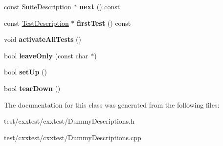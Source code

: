 \begin{DoxyCompactItemize}
\item 
\hypertarget{classCxxTest_1_1DummySuiteDescription_a375e255366523dae2bf42b30644ab924}{const \hyperlink{classCxxTest_1_1SuiteDescription}{Suite\-Description} $\ast$ {\bfseries next} () const }\label{classCxxTest_1_1DummySuiteDescription_a375e255366523dae2bf42b30644ab924}

\item 
\hypertarget{classCxxTest_1_1DummySuiteDescription_a3f14f70a29bde28dfede9627f684baa5}{const \hyperlink{classCxxTest_1_1TestDescription}{Test\-Description} $\ast$ {\bfseries first\-Test} () const }\label{classCxxTest_1_1DummySuiteDescription_a3f14f70a29bde28dfede9627f684baa5}

\item 
\hypertarget{classCxxTest_1_1DummySuiteDescription_ad0b362a31490c87bcc78d4f00b4026b4}{void {\bfseries activate\-All\-Tests} ()}\label{classCxxTest_1_1DummySuiteDescription_ad0b362a31490c87bcc78d4f00b4026b4}

\item 
\hypertarget{classCxxTest_1_1DummySuiteDescription_a7cf85000912335e4a70aed43190c2845}{bool {\bfseries leave\-Only} (const char $\ast$)}\label{classCxxTest_1_1DummySuiteDescription_a7cf85000912335e4a70aed43190c2845}

\item 
\hypertarget{classCxxTest_1_1DummySuiteDescription_a7c6d90effe118805dd651a8be2ca4582}{bool {\bfseries set\-Up} ()}\label{classCxxTest_1_1DummySuiteDescription_a7c6d90effe118805dd651a8be2ca4582}

\item 
\hypertarget{classCxxTest_1_1DummySuiteDescription_add53762c3405f0b5d159e61f5092ef00}{bool {\bfseries tear\-Down} ()}\label{classCxxTest_1_1DummySuiteDescription_add53762c3405f0b5d159e61f5092ef00}

\end{DoxyCompactItemize}


The documentation for this class was generated from the following files\-:\begin{DoxyCompactItemize}
\item 
test/cxxtest/cxxtest/Dummy\-Descriptions.\-h\item 
test/cxxtest/cxxtest/Dummy\-Descriptions.\-cpp\end{DoxyCompactItemize}
